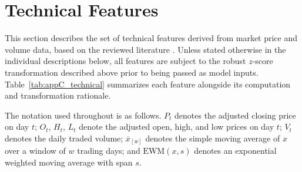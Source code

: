 \section{Technical Features}
\label{sec:features_technical}

This section describes the set of technical features derived from market price and volume data, based on the reviewed literature \cite{339f6, 93d76, 9c443, 03d81, a2e88, 0df79, ALOMARI2024210}. Unless stated otherwise in the individual descriptions below, all features are subject to the robust $z$-score transformation described above prior to being passed as model inputs. Table~\ref{tab:appC_technical} summarizes each feature alongside its computation and transformation rationale.

The notation used throughout is as follows. $P_t$ denotes the adjusted closing price on day $t$; $O_t$, $H_t$, $L_t$ denote the adjusted open, high, and low prices on day $t$; $V_t$ denotes the daily traded volume; $\overline{x}_{[w]}$ denotes the simple moving average of $x$ over a window of $w$ trading days; and $\mathrm{EWM}(x, s)$ denotes an exponential weighted moving average with span $s$.


